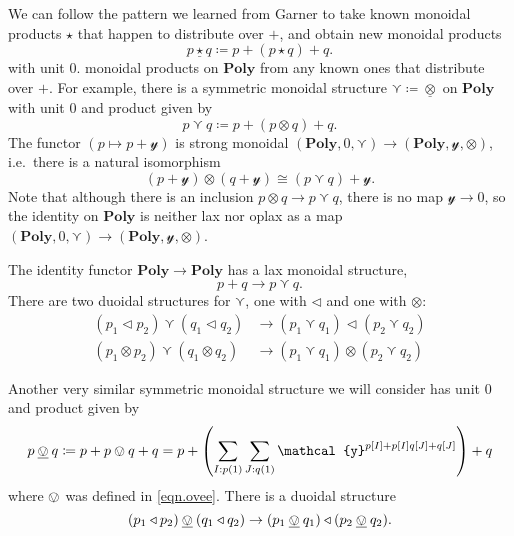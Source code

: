 \documentclass[11pt, one side, article]{memoir}
\theoremstyle{definition}
\theoremstyle{plain}
\newcommand{\Cat}[1]{\mathbf{#1}}%
\newcommand{\ul}[1]{\underline{#1}}
\newcommand{\yon}{{\mathcal{y}}}
\newcommand{\poly}{\Cat{Poly}}
\newcommand{\0}{\textsf{0}}
\newcommand{\1}{\tn{\textsf{1}}}
\newcommand{\tri}{\mathbin{\triangleleft}}
\newcommand{\OR}{\curlyvee}
\newcommand{\garner}[1]{\mathbin{\ul{#1}}}
\begin{document}
We can follow the pattern we learned from Garner to take known monoidal products $\star$ that happen to distribute over $+$, and obtain new monoidal products
\begin{equation}
p\garner{\star} q\coloneqq p+(p\star q) + q.
\end{equation}
with unit 0.  monoidal products on $\poly$ from any known ones that distribute over $+$. For example, there is a symmetric monoidal structure $\OR\coloneqq\garner\otimes$ on $\poly$ with unit $0$ and product given by
\begin{equation}\label{eqn.vee}
  p\OR q\coloneqq p+(p\otimes q)+q.
\end{equation}
The functor $(p\mapsto p+\yon)$ is strong monoidal $(\poly,0,\OR)\to(\poly,\yon,\otimes)$, i.e.\ there is a natural isomorphism
\begin{equation}
	(p+\yon)\otimes(q+\yon)\cong (p\OR q)+\yon.
\end{equation}
Note that although there is an inclusion $p\otimes q\to p\OR q$, there is no map $\yon\to0$, so the identity on $\poly$ is neither lax nor oplax as a map $(\poly,0,\OR)\to(\poly,\yon,\otimes)$.

The identity functor $\poly\to\poly$ has a lax monoidal structure,
\begin{equation}
	p+q\to p\OR q.
\end{equation}
There are two duoidal structures for $\OR$, one with $\tri$ and one with $\otimes$:
\begin{align*}
	(p_1\tri p_2)\OR(q_1\tri q_2)&\to(p_1\OR q_1)\tri(p_2\OR q_2)\\
	(p_1\otimes p_2)\OR(q_1\otimes q_2)&\to(p_1\OR q_1)\otimes(p_2\OR q_2)
\end{align*}

Another very similar symmetric monoidal structure we will consider has unit $0$ and product given by
\begin{equation}\label{eqn.garner_ovee}
	p\garner{\ovee} q\coloneqq p+p\ovee q+q=p+\left(\sum_{I:p(1)}\sum_{J:q(1)}\yon^{p[I]+p[I]q[J]+q[J]}\right)+q
\end{equation}
where $\ovee$ was defined in \eqref{eqn.ovee}. There is a duoidal structure
\begin{equation}\label{eqn.ovee_garner}
	(p_1\tri p_2)\garner{\ovee} (q_1\tri q_2)\to(p_1\garner{\ovee} q_1)\tri(p_2\garner{\ovee} q_2).
\end{equation}
\end{document}
